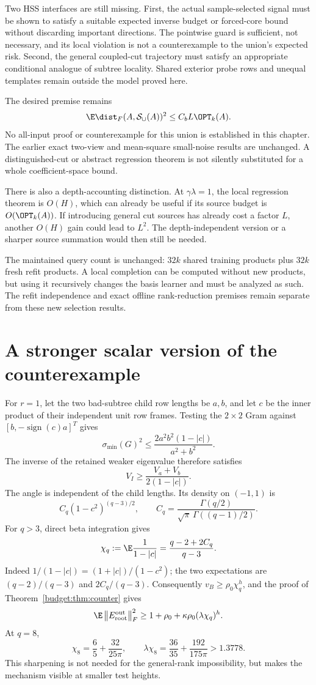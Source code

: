 \documentclass[11pt,oneside,openany,a4paper]{book}
\numberwithin{equation}{chapter}
\theoremstyle{definition}
\theoremstyle{remark}
\newcommand{\F}[1]{\left\lVert#1\right\rVert_F}
\begin{document}
Two HSS interfaces are still missing. First, the actual sample-selected signal must be shown to satisfy a suitable expected inverse budget or forced-core bound without discarding important directions. The pointwise guard is sufficient, not necessary, and its local violation is not a counterexample to the union's expected risk. Second, the general coupled-cut trajectory must satisfy an appropriate conditional analogue of subtree locality. Shared exterior probe rows and unequal templates remain outside the model proved here.

The desired premise remains
\[
 \E\dist_F(A,\mathcal S_\cup(A))^2\le C_bL\OPT_k(A).
\]
No all-input proof or counterexample for this union is established in this chapter. The earlier exact two-view and mean-square small-noise results are unchanged. A distinguished-cut or abstract regression theorem is not silently substituted for a whole coefficient-space bound.

There is also a depth-accounting distinction. At $\gamma\lambda=1$, the local regression theorem is $O(H)$, which can already be useful if its source budget is $O(\OPT_k(A))$. If introducing general cut sources has already cost a factor $L$, another $O(H)$ gain could lead to $L^2$. The depth-independent version or a sharper source summation would then still be needed.

The maintained query count is unchanged: $32k$ shared training products plus $32k$ fresh refit products. A local completion can be computed without new products, but using it recursively changes the basis learner and must be analyzed as such. The refit independence and exact offline rank-reduction premises remain separate from these new selection results.


\section{A stronger scalar version of the counterexample}\label{budget:sec:scalar}
For $r=1$, let the two bad-subtree child row lengths be $a,b$, and let $c$ be the inner product of their independent unit row frames. Testing the $2\times2$ Gram against $[b,-\operatorname{sign}(c)a]^T$ gives
\[
 \sigma_{\min}(G)^2\le\frac{2a^2b^2(1-|c|)}{a^2+b^2}.
\]
The inverse of the retained weaker eigenvalue therefore satisfies
\[
 V_I\ge\frac{V_a+V_b}{2(1-|c|)}.
\]
The angle is independent of the child lengths. Its density on $(-1,1)$ is
\[
 C_q(1-c^2)^{(q-3)/2},\qquad
 C_q=\frac{\Gamma(q/2)}{\sqrt\pi\,\Gamma((q-1)/2)}.
\]
For $q>3$, direct beta integration gives
\[
 \chi_q:=\E\frac1{1-|c|}
 =\frac{q-2+2C_q}{q-3}.
\]
Indeed $1/(1-|c|)=(1+|c|)/(1-c^2)$; the two expectations are $(q-2)/(q-3)$ and $2C_q/(q-3)$. Consequently $v_B\ge\rho_0\chi_q^h$, and the proof of Theorem~\ref{budget:thm:counter} gives
\[
 \E\F{E_{\rm root}^{\rm out}}^2
 \ge1+\rho_0+\kappa\rho_0(\lambda\chi_q)^h.
\]
At $q=8$,
\[
 \chi_8=\frac65+\frac{32}{25\pi},\qquad
 \lambda\chi_8=\frac{36}{35}+\frac{192}{175\pi}>1.3778.
\]
This sharpening is not needed for the general-rank impossibility, but makes the mechanism visible at smaller test heights.
\end{document}
